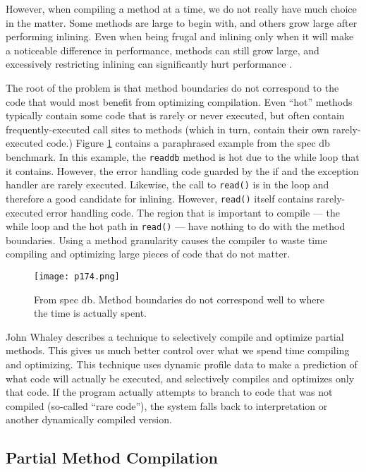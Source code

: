 However, when compiling a method at a time, we do not
really have much choice in the matter. Some methods are
large to begin with, and others grow large after performing
inlining. Even when being frugal and inlining only when it
will make a noticeable difference in performance, methods
can still grow large, and excessively restricting inlining can
significantly hurt performance \cite{suganuma2000overview}.


The root of the problem is that method boundaries do not
correspond to the code that would most benefit from optimizing compilation. Even “hot” methods typically contain
some code that is rarely or never executed, but often contain frequently-executed call sites to methods (which in turn,
contain their own rarely-executed code.) Figure \ref{fig:p174} contains a
paraphrased example from the spec db benchmark. In
this example, the \texttt{readdb} method is hot due to the while
loop that it contains. However, the error handling code
guarded by the if and the exception handler are rarely
executed. Likewise, the call to \texttt{read()} is in the loop and
therefore a good candidate for inlining. However, \texttt{read()}
itself contains rarely-executed error handling code. The region that is important to compile — the while loop and the
hot path in \texttt{read()} — have nothing to do with the method
boundaries. Using a method granularity causes the compiler
to waste time compiling and optimizing large pieces of code
that do not matter.


\begin{figure}[H]
	\centering
	\texttt{[image: p174.png]}
	\caption{From spec db. Method boundaries do not
		correspond well to where the time is actually spent.}
	\label{fig:p174}
\end{figure}

John Whaley\cite{whaley2001partial} describes a technique to selectively compile and
optimize partial methods. This gives us much better control
over what we spend time compiling and optimizing. This
technique uses dynamic profile data to make a prediction of
what code will actually be executed, and selectively compiles and optimizes only that code. If the program actually
attempts to branch to code that was not compiled (so-called
“rare code”), the system falls back to interpretation or another dynamically compiled version.

\subsection{Partial Method Compilation}


